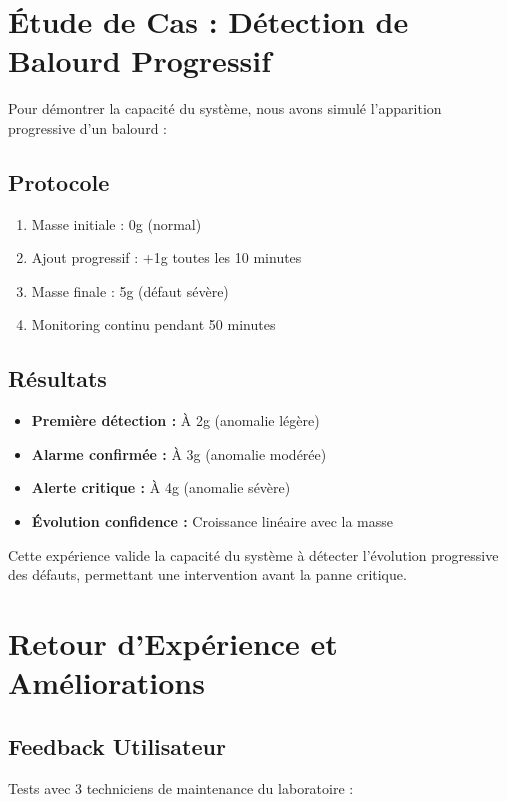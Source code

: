 \section{Étude de Cas : Détection de Balourd Progressif}

Pour démontrer la capacité du système, nous avons simulé l'apparition progressive d'un balourd :

\subsection{Protocole}
\begin{enumerate}
    \item Masse initiale : 0g (normal)
    \item Ajout progressif : +1g toutes les 10 minutes
    \item Masse finale : 5g (défaut sévère)
    \item Monitoring continu pendant 50 minutes
\end{enumerate}

\subsection{Résultats}
\begin{itemize}
    \item \textbf{Première détection :} À 2g (anomalie légère)
    \item \textbf{Alarme confirmée :} À 3g (anomalie modérée)
    \item \textbf{Alerte critique :} À 4g (anomalie sévère)
    \item \textbf{Évolution confidence :} Croissance linéaire avec la masse
\end{itemize}

Cette expérience valide la capacité du système à détecter l'évolution progressive des défauts, permettant une intervention avant la panne critique.

\section{Retour d'Expérience et Améliorations}

\subsection{Feedback Utilisateur}

Tests avec 3 techniciens de maintenance du laboratoire :


